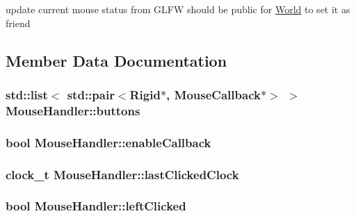 update current mouse status from G\+L\+F\+W should be public for \hyperlink{classWorld}{World} to set it as friend 



\subsection{Member Data Documentation}
\hypertarget{classMouseHandler_acfb0584232c1d5b8a87028d3008133e3}{}
\subsubsection[{buttons}]{\setlength{\rightskip}{0pt plus 5cm}std\+::list$<$ std\+::pair$<${\bf Rigid}$\ast$, {\bf Mouse\+Callback}$\ast$$>$ $>$ Mouse\+Handler\+::buttons\hspace{0.3cm}{\ttfamily [private]}}\label{classMouseHandler_acfb0584232c1d5b8a87028d3008133e3}
\hypertarget{classMouseHandler_a29da34736a6d4f948a536f4d95bb146e}{}
\subsubsection[{enable\+Callback}]{\setlength{\rightskip}{0pt plus 5cm}bool Mouse\+Handler\+::enable\+Callback\hspace{0.3cm}{\ttfamily [private]}}\label{classMouseHandler_a29da34736a6d4f948a536f4d95bb146e}
\hypertarget{classMouseHandler_a6c3cee7fc0ca734bace60b951fb96b14}{}
\subsubsection[{last\+Clicked\+Clock}]{\setlength{\rightskip}{0pt plus 5cm}clock\+\_\+t Mouse\+Handler\+::last\+Clicked\+Clock\hspace{0.3cm}{\ttfamily [private]}}\label{classMouseHandler_a6c3cee7fc0ca734bace60b951fb96b14}
\hypertarget{classMouseHandler_ae6ab60c2b4761c3e90bfaab2e305e41e}{}
\subsubsection[{left\+Clicked}]{\setlength{\rightskip}{0pt plus 5cm}bool Mouse\+Handler\+::left\+Clicked\hspace{0.3cm}{\ttfamily [private]}}\label{classMouseHandler_ae6ab60c2b4761c3e90bfaab2e305e41e}
\hypertarget{classMouseHandler_a42f557e16701dab03efb4f99374ea524}{}
